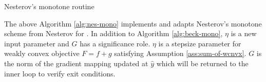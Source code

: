 \documentclass[12pt]{report}
\begin{document}
            \begin{algorithm}[H]
                \begin{algorithmic}[1]
                        \ENDIF
                    \ENDFOR
                    \caption{Nesterov's monotone routine}\label{alg:nes-mono}
                \end{algorithmic}
            \end{algorithm}
            \par
            The above Algorithm \ref{alg:nes-mono} implements and adapts Nesterov's monotone scheme from Nesterov \cite[2.2.32]{nesterov_lectures_2018} for \XXAPG{}. 
            In addition to Algorithm \ref{alg:beck-mono}, $\eta$ is a new input parameter and $G$ has a significance role. 
            $\eta$ is a stepsize parameter for weakly convex objective $F = f + g$ satisfying Assumption \ref{ass:sum-of-wcnvx}. 
            $G$ is the norm of the gradient mapping updated at $\hat y$ which will be returned to the inner loop to verify exit conditions. 
        
\end{document}

